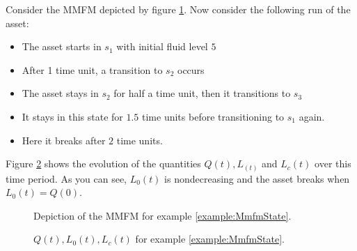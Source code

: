 \begin{example}\label{example:MmfmState}
	Consider the MMFM depicted by figure \ref{figure:MmfmExample}.
	Now consider the following run of the asset:
	\begin{itemize}
		\item The asset starts in $s_1$ with initial fluid level $5$
		\item After 1 time unit, a transition to $s_2$ occurs
		\item The asset stays in $s_2$ for half a time unit, then it transitions to $s_3$
		\item It stays in this state for $1.5$ time units before transitioning to $s_1$ again.
		\item Here it breaks after $2$ time units.
	\end{itemize}
	Figure \ref{figure:MmfmExampleQuantities} shows the evolution of the quantities $Q(t),L_(t)$ and $L_c(t)$ over this time period.
	As you can see, $L_0(t)$ is nondecreasing and the asset breaks when $L_0(t)=Q(0)$.
\end{example}
\begin{figure}
\centering
{}
\caption{Depiction of the MMFM for example \ref{example:MmfmState}.}
\label{figure:MmfmExample}
\end{figure}
\begin{figure}[H]
\centering
\setlength{}

\caption{$Q(t),L_0(t),L_c(t)$ for example \ref{example:MmfmState}.}
\label{figure:MmfmExampleQuantities}
\end{figure}

